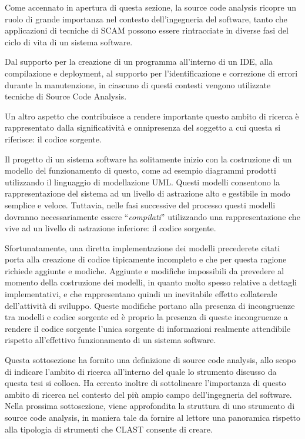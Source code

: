 Come accennato in apertura di questa sezione, la source code analysis ricopre un
ruolo di grande importanza nel contesto dell'ingegneria del software, tanto che
applicazioni di tecniche di SCAM possono essere rintracciate in diverse fasi
del ciclo di vita di un sistema software.

Dal supporto per la creazione di un programma all’interno di un IDE, alla
compilazione e deployment, al supporto per l'identificazione e correzione di
errori durante la manutenzione, in ciascuno di questi contesti vengono
utilizzate tecniche di Source Code Analysis.

Un altro aspetto che contribuisce a rendere importante questo ambito di ricerca
è rappresentato dalla significatività e onnipresenza del soggetto a cui questa
si riferisce: il codice sorgente.

Il progetto di un sistema software ha solitamente inizio con la costruzione di
un modello del funzionamento di questo, come ad esempio diagrammi prodotti
utilizzando il linguaggio di modellazione UML. Questi modelli consentono la
rappresentazione del sistema ad un livello di astrazione alto e gestibile in
modo semplice e veloce. Tuttavia, nelle fasi successive del processo questi
modelli dovranno necessariamente essere \enquote{\textit{compilati}} utilizzando
una rappresentazione che vive ad un livello di astrazione inferiore: il codice
sorgente.

Sfortunatamente, una diretta implementazione dei modelli precederete citati
porta alla creazione di codice tipicamente incompleto e che per questa ragione
richiede aggiunte e modiche. Aggiunte e modifiche impossibili da prevedere al
momento della costruzione dei modelli, in quanto molto spesso relative a
dettagli implementativi, e che rappresentano quindi un inevitabile effetto
collaterale dell'attività di sviluppo. Queste modifiche portano alla presenza di
incongruenze tra modelli e codice sorgente ed è proprio la presenza di queste
incongruenze a rendere il codice sorgente l’unica sorgente di informazioni
realmente attendibile rispetto all’effettivo funzionamento di un sistema
software.

Questa sottosezione ha fornito una definizione di source code analysis, allo
scopo di indicare l'ambito di ricerca all'interno del quale lo strumento
discusso da questa tesi si colloca. Ha cercato inoltre di sottolineare
l'importanza di questo ambito di ricerca nel contesto del più ampio campo
dell'ingegneria del software. Nella prossima sottosezione, viene approfondita la
struttura di uno strumento di source code analysis, in maniera tale da fornire
al lettore una panoramica rispetto alla tipologia di strumenti che CLAST
consente di creare.


